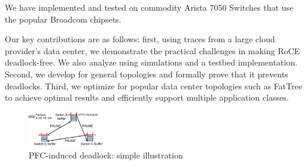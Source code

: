 
We have implemented and tested \sysname{} on commodity Arista 7050 Switches that
use the popular Broadcom chipsets.

Our key contributions are as follows: first, using traces from a large cloud
provider's data center, we demonstrate the practical challenges in making RoCE
deadlock-free. We also analyze \sysname{} using simulations and a testbed
implementation. Second, we develop \sysname{} for general topologies and
formally prove that it prevents deadlocks. Third, we optimize \sysname{} for
popular data center topologies such as FatTree to achieve optimal results and
efficiently support multiple application classes.  

\begin{figure}
	\centering
	\includegraphics[width=0.3\textwidth] {figs/deadlock}
	\vspace{-0.15in}
	\caption{PFC-induced deadlock: simple illustration}
	\vspace{-0.25in}
	\label{fig:deadlock_example}
\end{figure}
